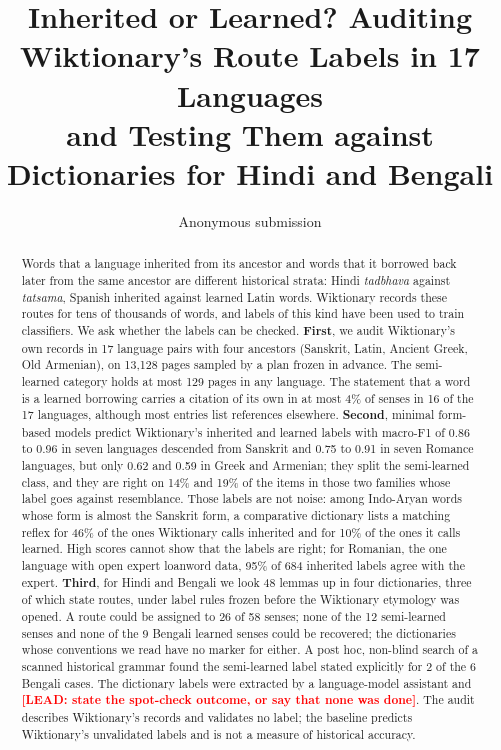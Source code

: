 \documentclass[11pt]{article}
\title{Inherited or Learned? Auditing Wiktionary's Route Labels in 17 Languages\\and Testing Them against Dictionaries for Hindi and Bengali}
\author{Anonymous submission}
\newcommand{\lead}[1]{\textcolor{red}{\textbf{[LEAD: #1]}}}
\begin{document}
\maketitle

\begin{abstract}
Words that a language inherited from its ancestor and words that it borrowed back later from the same ancestor are different historical strata: Hindi \textit{tadbhava} against \textit{tatsama}, Spanish inherited against learned Latin words. Wiktionary records these routes for tens of thousands of words, and labels of this kind have been used to train classifiers. We ask whether the labels can be checked. \textbf{First}, we audit Wiktionary's own records in 17 language pairs with four ancestors (Sanskrit, Latin, Ancient Greek, Old Armenian), on 13,128 pages sampled by a plan frozen in advance. The semi-learned category holds at most 129 pages in any language. The statement that a word is a learned borrowing carries a citation of its own in at most 4\% of senses in 16 of the 17 languages, although most entries list references elsewhere. \textbf{Second}, minimal form-based models predict Wiktionary's inherited and learned labels with macro-F1 of 0.86 to 0.96 in seven languages descended from Sanskrit and 0.75 to 0.91 in seven Romance languages, but only 0.62 and 0.59 in Greek and Armenian; they split the semi-learned class, and they are right on 14\% and 19\% of the items in those two families whose label goes against resemblance. Those labels are not noise: among Indo-Aryan words whose form is almost the Sanskrit form, a comparative dictionary lists a matching reflex for 46\% of the ones Wiktionary calls inherited and for 10\% of the ones it calls learned. High scores cannot show that the labels are right; for Romanian, the one language with open expert loanword data, 95\% of 684 inherited labels agree with the expert. \textbf{Third}, for Hindi and Bengali we look 48 lemmas up in four dictionaries, three of which state routes, under label rules frozen before the Wiktionary etymology was opened. A route could be assigned to 26 of 58 senses; none of the 12 semi-learned senses and none of the 9 Bengali learned senses could be recovered; the dictionaries whose conventions we read have no marker for either. A post hoc, non-blind search of a scanned historical grammar found the semi-learned label stated explicitly for 2 of the 6 Bengali cases. The dictionary labels were extracted by a language-model assistant and \lead{state the spot-check outcome, or say that none was done}. The audit describes Wiktionary's records and validates no label; the baseline predicts Wiktionary's unvalidated labels and is not a measure of historical accuracy.
\end{abstract}
\end{document}
